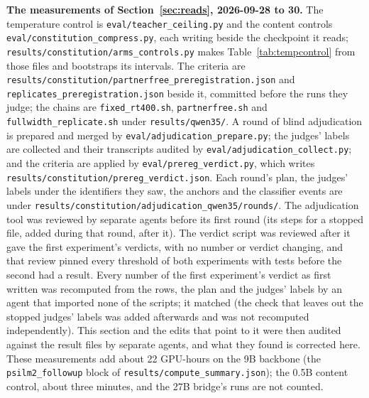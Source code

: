 \documentclass[11pt]{article}
\newcommand{\code}[1]{\texttt{#1}}
\begin{document}
\begin{sloppypar}
\textbf{The measurements of Section~\ref{sec:reads}, 2026-09-28 to 30.} The temperature
control is \code{eval/\allowbreak{}teacher\_ceiling.py} and the content controls
\code{eval/\allowbreak{}constitution\_compress.py}, each writing beside the checkpoint it reads;
\code{results/\allowbreak{}constitution/\allowbreak{}arms\_controls.py} makes
Table~\ref{tab:tempcontrol} from those files and
bootstraps its intervals. The criteria are \code{results/\allowbreak{}constitution/\allowbreak{}partnerfree\_\allowbreak{}preregistration.json}
and \code{replicates\_\allowbreak{}preregistration.json} beside it, committed before the runs they judge; the
chains are \code{fixed\_\allowbreak{}rt400.sh}, \code{partnerfree.sh} and
\code{fullwidth\_\allowbreak{}replicate.sh} under \code{results/\allowbreak{}qwen35/}. A round of blind
adjudication is prepared and merged by
\code{eval/\allowbreak{}adjudication\_\allowbreak{}prepare.py}; the judges' labels are collected and their
transcripts audited by \code{eval/\allowbreak{}adjudication\_\allowbreak{}collect.py}; and the criteria are applied by \code{eval/\allowbreak{}prereg\_\allowbreak{}verdict.py}, which writes
\code{results/\allowbreak{}constitution/\allowbreak{}prereg\_\allowbreak{}verdict.json}. Each round's plan, the judges' labels
under the identifiers they saw, the anchors and the classifier events are under
\code{results/\allowbreak{}constitution/\allowbreak{}adjudication\_qwen35/\allowbreak{}rounds/}. The adjudication tool was reviewed
by separate agents before its first round (its steps for a stopped file, added
during that round, after it). The verdict script was reviewed after it gave the first
experiment's verdicts, with no number or verdict changing, and that review pinned
every threshold of both experiments with tests before the second had a result. Every
number of the first experiment's verdict as first written was recomputed from the
rows, the plan and the judges' labels by an agent that imported none of the scripts;
it matched (the check that leaves out the stopped judges' labels was added afterwards
and was not recomputed independently). This section and the edits that point to it
were then audited against the result files by separate agents, and what they found is
corrected here. These measurements add about 22 GPU-hours on the 9B backbone (the
\code{psilm2\_followup} block of \code{results/\allowbreak{}compute\_summary.json}); the 0.5B
content control, about three minutes, and the 27B bridge's runs are not counted.


\end{sloppypar}
\end{document}

